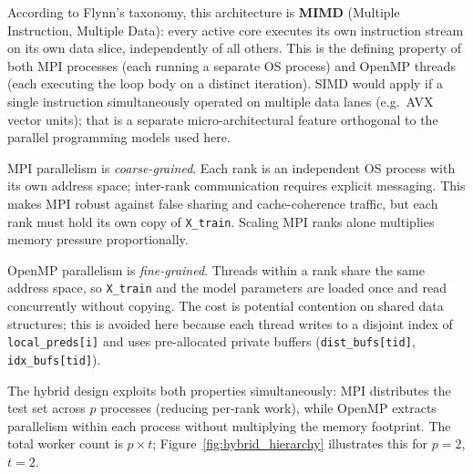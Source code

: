 \documentclass[12pt,a4paper]{article}
\begin{document}
According to Flynn's taxonomy, this architecture is \textbf{MIMD} (Multiple
Instruction, Multiple Data): every active core executes its own instruction
stream on its own data slice, independently of all others. This is the
defining property of both MPI processes (each running a separate OS process)
and OpenMP threads (each executing the loop body on a distinct iteration).
SIMD would apply if a single instruction simultaneously operated on multiple
data lanes (e.g.\ AVX vector units); that is a separate micro-architectural
feature orthogonal to the parallel programming models used here.

MPI parallelism is \emph{coarse-grained}. Each rank is an independent OS
process with its own address space; inter-rank communication requires
explicit messaging. This makes MPI robust against false sharing and
cache-coherence traffic, but each rank must hold its own copy of
\texttt{X\_train}. Scaling MPI ranks alone multiplies memory pressure
proportionally.

OpenMP parallelism is \emph{fine-grained}. Threads within a rank share the
same address space, so \texttt{X\_train} and the model parameters are loaded
once and read concurrently without copying. The cost is potential contention
on shared data structures; this is avoided here because each thread writes to a
disjoint index of \texttt{local\_preds[i]} and uses pre-allocated private
buffers (\texttt{dist\_bufs[tid]}, \texttt{idx\_bufs[tid]}).

The hybrid design exploits both properties simultaneously: MPI distributes
the test set across $p$ processes (reducing per-rank work), while OpenMP
extracts parallelism within each process without multiplying the memory
footprint. The total worker count is $p \times t$;
Figure~\ref{fig:hybrid_hierarchy} illustrates this for $p=2$, $t=2$.
\end{document}
